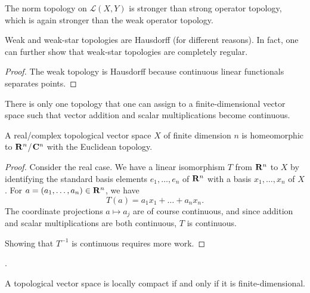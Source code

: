 The norm topology on $\mathcal L(X,Y)$ is stronger than strong operator topology, which is again stronger than the weak operator topology.

\begin{prop}
    Weak and weak-star topologies are Hausdorff (for different reasons). In fact, one can further show that weak-star topologies are completely regular.
\end{prop}
\begin{proof}
    The weak topology is Hausdorff because continuous linear functionals separates points.
\end{proof}

There is only one topology that one can assign to a finite-dimensional vector space such that vector addition and scalar multiplications become continuous.

\begin{prop}
    A real/complex topological vector space $X$ of finite dimension $n$ is homeomorphic to $\mathbf{R}^n$/$\mathbf{C}^n$ with the Euclidean topology.
\end{prop}
\begin{proof}
    Consider the real case. We have a linear isomorphism $T$ from $\mathbf{R}^n$ to $X$ by identifying the standard basis elements $e_1,\dotsc,e_n$ of $\mathbf{R}^n$ with a basis $x_1,\dotsc,x_n$ of $X$. For $a = (a_1,\dotsc,a_n) \in \mathbf{R}^n$, we have \[
        T(a) = a_1x_1+\dotsc+a_nx_n.
    \] The coordinate projections $a \mapsto a_j$ are of course continuous, and since addition and scalar multiplications are both continuous, $T$ is continuous.

    Showing that $T^{-1}$ is continuous requires more work.
\end{proof}.

\begin{prop}
    A topological vector space is locally compact if and only if it is finite-dimensional.
\end{prop}

